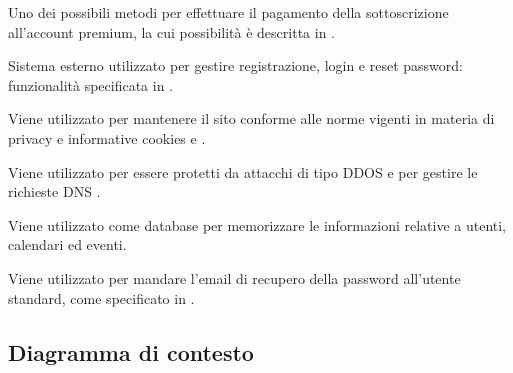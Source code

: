 \begin{listaPersonale}[ACO]{}
    Uno dei possibili metodi per effettuare il pagamento della sottoscrizione all'account premium, la cui possibilità è descritta in .

    Sistema esterno utilizzato  per gestire registrazione, login e reset password: funzionalità specificata in .

    Viene utilizzato per mantenere il sito conforme alle norme vigenti in materia di privacy e informative cookies  e .

    Viene utilizzato per essere protetti da attacchi di tipo DDOS e per gestire le richieste DNS .

    Viene utilizzato come database per memorizzare le informazioni relative a utenti, calendari ed eventi.

    Viene utilizzato per mandare l'email di recupero della password all'utente standard, come specificato in .

\end{listaPersonale}


\subsection{Diagramma di contesto}

